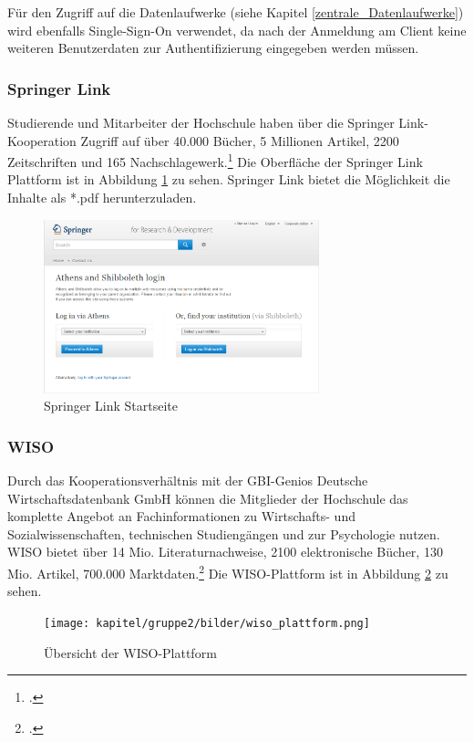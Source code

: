 Für den Zugriff auf die Datenlaufwerke (siehe Kapitel \ref{zentrale_Datenlaufwerke}) wird ebenfalls Single-Sign-On verwendet, da nach der Anmeldung am Client keine weiteren Benutzerdaten zur Authentifizierung eingegeben werden müssen. 

\subsubsection{Springer Link}
Studierende und Mitarbeiter der Hochschule haben über die Springer Link-Kooperation Zugriff auf über 40.000 Bücher, 5 Millionen Artikel, 2200 Zeitschriften und 165 Nachschlagewerk.\footcite{springer_springerlink_faq_2015} Die Oberfläche der Springer Link Plattform ist in Abbildung \ref{fig_springerlink_startseite} zu sehen. Springer Link bietet die Möglichkeit die Inhalte als *.pdf herunterzuladen. 

\begin{figure}[h!]
	\centering
	\includegraphics[width=8cm]{kapitel/gruppe2/bilder/springerlink_startseite}
	\caption{Springer Link Startseite \protect\footnotemark}
	\label{fig_springerlink_startseite}
\end{figure}

\subsubsection{WISO}
Durch das Kooperationsverhältnis mit der GBI-Genios Deutsche Wirtschaftsdatenbank GmbH können die Mitglieder der Hochschule das komplette Angebot an Fachinformationen zu Wirtschafts- und Sozialwissenschaften, technischen Studiengängen und zur Psychologie  nutzen. WISO bietet über 14 Mio. Literaturnachweise, 2100 elektronische Bücher, 130 Mio. Artikel, 700.000 Marktdaten.\footcite{gbi_genios_uber_wiso_2015} Die WISO-Plattform ist in Abbildung \ref{fig_wiso_plattform.png} zu sehen.

\begin{figure}[h!]
	\centering
	\texttt{[image: kapitel/gruppe2/bilder/wiso\_plattform.png]}
	\caption{Übersicht der WISO-Plattform \protect\footnotemark}
	\label{fig_wiso_plattform.png}
\end{figure}

